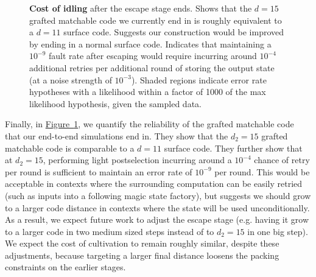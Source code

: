 \documentclass[onecolumn,unpublished,a4paper]{quantumarticle}
\theoremstyle{definition}
\newcommand{\fig}[1]{\hyperref[fig:#1]{Figure~\ref*{fig:#1}}}
\begin{document}
\begin{figure}
    \centering
    \caption{
        \textbf{Cost of idling} after the escape stage ends.
        Shows that the $d=15$ grafted matchable code we currently end in is roughly equivalent to a $d=11$ surface code.
        Suggests our construction would be improved by ending in a normal surface code.
        Indicates that maintaining a $10^{-9}$ fault rate after escaping would require incurring around $10^{-4}$ additional retries per additional round of storing the output state (at a noise strength of $10^{-3}$).
        Shaded regions indicate error rate hypotheses with a likelihood within a factor of 1000 of the max likelihood hypothesis, given the sampled data.
    }
    \label{fig:idling-gap}
\end{figure}

Finally, in \fig{idling-gap}, we quantify the reliability of the grafted matchable code that our end-to-end simulations end in.
They show that the $d_2=15$ grafted matchable code is comparable to a $d=11$ surface code.
They further show that at $d_2=15$, performing light postselection incurring around a $10^{-4}$ chance of retry per round is sufficient to maintain an error rate of $10^{-9}$ per round.
This would be acceptable in contexts where the surrounding computation can be easily retried (such as inputs into a following magic state factory), but suggests we should grow to a larger code distance in contexts where the state will be used unconditionally.
As a result, we expect future work to adjust the escape stage (e.g. having it grow to a larger code in two medium sized steps instead of to $d_2=15$ in one big step).
We expect the cost of cultivation to remain roughly similar, despite these adjustments, because targeting a larger final distance loosens the packing constraints on the earlier stages.
\end{document}
